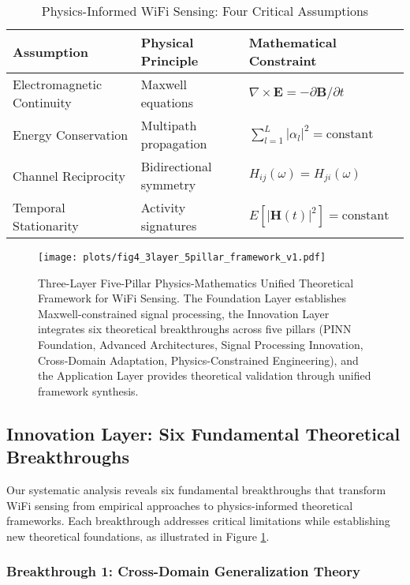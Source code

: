 \documentclass[journal]{IEEEtran}
\begin{document}
\begin{table}[h]
\centering
\caption{Physics-Informed WiFi Sensing: Four Critical Assumptions}
\label{tab:physics_assumptions}
\begin{tabular}{|p{1.8cm}|p{2.2cm}|p{2.5cm}|}
\hline
\textbf{Assumption} & \textbf{Physical Principle} & \textbf{Mathematical Constraint} \\
\hline
Electromagnetic Continuity & Maxwell equations & $\nabla \times \mathbf{E} = -\partial \mathbf{B}/\partial t$ \\
Energy Conservation & Multipath propagation & $\sum_{l=1}^{L} |\alpha_l|^2 = \text{constant}$ \\
Channel Reciprocity & Bidirectional symmetry & $H_{ij}(\omega) = H_{ji}(\omega)$ \\
Temporal Stationarity & Activity signatures & $E[|\mathbf{H}(t)|^2] = \text{constant}$ \\
\hline
\end{tabular}
\end{table}

\begin{figure}[h]
\centering
\texttt{[image: plots/fig4\_3layer\_5pillar\_framework\_v1.pdf]}
\caption{Three-Layer Five-Pillar Physics-Mathematics Unified Theoretical Framework for WiFi Sensing. The Foundation Layer establishes Maxwell-constrained signal processing, the Innovation Layer integrates six theoretical breakthroughs across five pillars (PINN Foundation, Advanced Architectures, Signal Processing Innovation, Cross-Domain Adaptation, Physics-Constrained Engineering), and the Application Layer provides theoretical validation through unified framework synthesis.}
\label{fig:3layer_5pillar_framework}
\end{figure}

\subsection{Innovation Layer: Six Fundamental Theoretical Breakthroughs}

Our systematic analysis reveals six fundamental breakthroughs that transform WiFi sensing from empirical approaches to physics-informed theoretical frameworks. Each breakthrough addresses critical limitations while establishing new theoretical foundations, as illustrated in Figure \ref{fig:3layer_5pillar_framework}.

\subsubsection{Breakthrough 1: Cross-Domain Generalization Theory}
\end{document}
